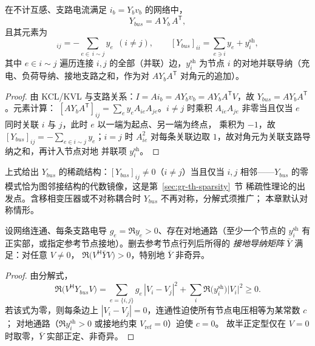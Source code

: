 \begin{theorem}[节点导纳矩阵的关联矩阵分解]\label{sec:gr-th-ybus}
在不计互感、支路电流满足 $i_b=Y_bv_b$ 的网络中，
\begin{equation}
Y_{bus}=A\,Y_b\,A^{\mathsf T},
\end{equation}
且其元素为
\begin{equation}
[Y_{bus}]_{ij}=-\sum_{e\in\,i\!\sim\!j}y_e\ \ (i\ne j),
\qquad
[Y_{bus}]_{ii}=\sum_{e\ni i}y_e+y_i^{\mathrm{sh}},
\end{equation}
其中 $e\in i\!\sim\!j$ 遍历连接 $i,j$ 的全部（并联）边，$y_i^{\mathrm{sh}}$ 为节点
$i$ 的对地并联导纳（充电、负荷导纳、接地支路之和，作为对 $A Y_b A^{\mathsf T}$
对角元的追加）。
\end{theorem}
\begin{proof}
由 KCL/KVL 与支路关系：$I=Ai_b=AY_bv_b=AY_bA^{\mathsf T}V$，故
$Y_{bus}=AY_bA^{\mathsf T}$。元素计算：
$[AY_bA^{\mathsf T}]_{ij}=\sum_e y_eA_{ie}A_{je}$。$i\ne j$ 时乘积 $A_{ie}A_{je}$
非零当且仅当 $e$ 同时关联 $i$ 与 $j$，此时 $e$ 以一端为起点、另一端为终点，
乘积为 $-1$，故 $[Y_{bus}]_{ij}=-\sum_{e\in i\sim j}y_e$；$i=j$ 时
$A_{ie}^2$ 对每条关联边取 $1$，故对角元为关联支路导纳之和，再计入节点对地
并联项 $y_i^{\mathrm{sh}}$。
\end{proof}

\begin{remark}
上式给出 $Y_{bus}$ 的稀疏结构：$[Y_{bus}]_{ij}\ne0$（$i\ne j$）当且仅当
$i,j$ 相邻——$Y_{bus}$ 的零模式恰为图邻接结构的代数镜像，这是第~\ref{sec:gr-th-sparsity}~节
稀疏性理论的出发点。含移相变压器或不对称耦合时 $Y_{bus}$ 不再对称，分解式须推广；
本章默认对称情形。
\end{remark}

\begin{theorem}[接地导纳矩阵的正定性]\label{sec:gr-th-ybus-pd}
设网络连通、每条支路电导 $g_e=\Re y_e>0$、存在对地通路（至少一个节点的
$y_i^{\mathrm{sh}}$ 有正实部，或指定参考节点接地）。删去参考节点行列后所得的
\emph{接地导纳矩阵} $\bar Y$ 满足：对任意 $V\ne0$，
$\Re\bigl(V^{\mathsf H}\bar YV\bigr)>0$，特别地 $\bar Y$ 非奇异。
\end{theorem}
\begin{proof}
由分解式，
\begin{equation}
\Re\bigl(V^{\mathsf H}Y_{bus}V\bigr)
=\sum_{e=\{i,j\}}g_e\,|V_i-V_j|^2+\sum_i \Re\bigl(y_i^{\mathrm{sh}}\bigr)|V_i|^2\ge0.
\end{equation}
若该式为零，则每条边上 $|V_i-V_j|=0$，连通性迫使所有节点电压相等为某常数 $c$；
对地通路（$\Re y_i^{\mathrm{sh}}>0$ 或接地约束 $V_{\mathrm{ref}}=0$）迫使 $c=0$。
故半正定型仅在 $V=0$ 时取零，$\bar Y$ 实部正定、非奇异。
\end{proof}

